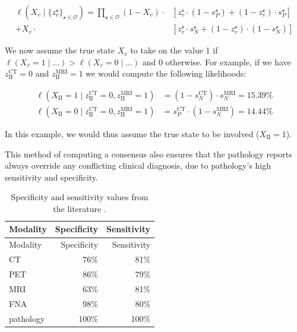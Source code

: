 \documentclass[
  sn-mathphys-num,
]{sn-jnl}
\begin{document}
\[
\begin{aligned}
\ell \left( X_v \mid \{ z_v^{\mathcal{o}} \}_{\mathcal{o} \in \mathcal{O}} \right) = \prod_{\mathcal{o} \in \mathcal{O}}
\left( 1 - X_v \right) \cdot &\left[ z_v^{\mathcal{o}} \cdot \left( 1 - s_P^{\mathcal{o}} \right) + \left( 1 - z_v^{\mathcal{o}} \right) \cdot s_P^{\mathcal{o}} \right] \\
+ X_v \cdot &\left[ z_v^{\mathcal{o}} \cdot s_N^{\mathcal{o}} + \left( 1 - z_v^{\mathcal{o}} \right) \cdot (1 - s_N^{\mathcal{o}}) \right]
\end{aligned}
\]

We now assume the true state \(X_v\) to take on the value 1 if
\(\ell \left( X_v = 1 \mid \ldots \right) > \ell \left( X_v = 0 \mid \ldots \right)\)
and 0 otherwise. For example, if we have \(z_\text{II}^\text{CT} = 0\)
and \(z_\text{II}^\text{MRI} = 1\) we would compute the following
likelihoods:

\[
\begin{aligned}
\ell \left( X_\text{II} = 1 \mid z_\text{II}^\text{CT} = 0, z_\text{II}^\text{MRI} = 1 \right) &= \left( 1 - s_N^\text{CT} \right) \cdot s_N^\text{MRI} = 15.39\% \\
\ell \left( X_\text{II} = 0 \mid z_\text{II}^\text{CT} = 0, z_\text{II}^\text{MRI} = 1 \right) &= s_P^\text{CT} \cdot \left(1 - s_N^\text{MRI}\right) = 14.44\%
\end{aligned}
\]

In this example, we would thus assume the true state to be involved
(\(X_\text{II} = 1\)).

This method of computing a consensus also ensures that the pathology
reports always override any conflicting clinical diagnosis, due to
pathology's high sensitivity and specificity.

\begin{longtable}[]{@{}lrr@{}}
\caption{Specificity and sensitivity values from the literature
\citep{debondt_detection_2007, kyzas_18ffluorodeoxyglucose_2008}.}\label{tbl-spec-sens}\tabularnewline
\toprule\noalign{}
Modality & Specificity & Sensitivity \\
\midrule\noalign{}
\endfirsthead
\toprule\noalign{}
Modality & Specificity & Sensitivity \\
\midrule\noalign{}
\endhead
\bottomrule\noalign{}
\endlastfoot
CT & 76\% & 81\% \\
PET & 86\% & 79\% \\
MRI & 63\% & 81\% \\
FNA & 98\% & 80\% \\
pathology & 100\% & 100\% \\
\end{longtable}
\end{document}
